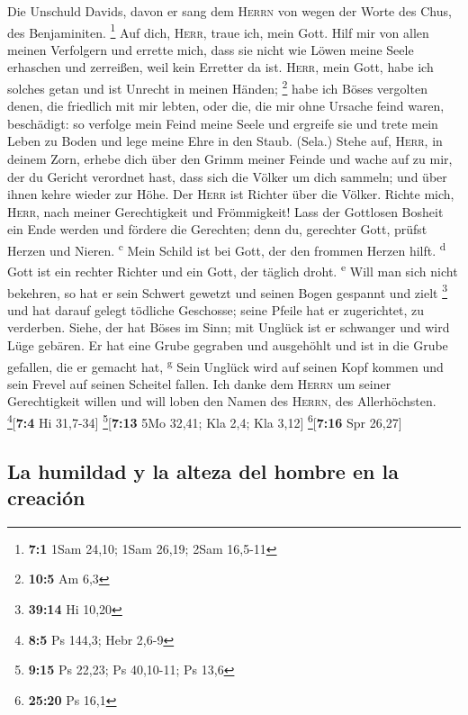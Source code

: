  Die Unschuld Davids, davon er sang dem \textsc{Herrn} von
wegen der Worte des Chus, des Benjaminiten. \footnote{\textbf{7:1} 1Sam
  24,10; 1Sam 26,19; 2Sam 16,5-11}  Auf dich,
\textsc{Herr}, traue ich, mein Gott. Hilf mir von allen meinen
Verfolgern und errette mich,  dass sie nicht wie Löwen
meine Seele erhaschen und zerreißen, weil kein Erretter da ist.
 \textsc{Herr}, mein Gott, habe ich solches getan und ist
Unrecht in meinen Händen; \footnote{\textbf{10:5} Am 6,3} 
habe ich Böses vergolten denen, die friedlich mit mir lebten, oder die,
die mir ohne Ursache feind waren, beschädigt:  so verfolge
mein Feind meine Seele und ergreife sie und trete mein Leben zu Boden
und lege meine Ehre in den Staub. (Sela.)  Stehe auf,
\textsc{Herr}, in deinem Zorn, erhebe dich über den Grimm meiner Feinde
und wache auf zu mir, der du Gericht verordnet hast,  dass
sich die Völker um dich sammeln; und über ihnen kehre wieder zur Höhe.
 Der \textsc{Herr} ist Richter über die Völker. Richte
mich, \textsc{Herr}, nach meiner Gerechtigkeit und Frömmigkeit!
 Lass der Gottlosen Bosheit ein Ende werden und fördere
die Gerechten; denn du, gerechter Gott, prüfst Herzen und Nieren.
\textsuperscript{c}  Mein Schild ist bei Gott, der den
frommen Herzen hilft. \textsuperscript{d}  Gott ist ein
rechter Richter und ein Gott, der täglich droht. \textsuperscript{e}
 Will man sich nicht bekehren, so hat er sein Schwert
gewetzt und seinen Bogen gespannt und zielt \footnote{\textbf{39:14} Hi
  10,20}  und hat darauf gelegt tödliche Geschosse; seine
Pfeile hat er zugerichtet, zu verderben.  Siehe, der hat
Böses im Sinn; mit Unglück ist er schwanger und wird Lüge gebären.
 Er hat eine Grube gegraben und ausgehöhlt und ist in die
Grube gefallen, die er gemacht hat, \textsuperscript{g} 
Sein Unglück wird auf seinen Kopf kommen und sein Frevel auf seinen
Scheitel fallen.  Ich danke dem \textsc{Herrn} um seiner
Gerechtigkeit willen und will loben den Namen des \textsc{Herrn}, des
Allerhöchsten. \footnote{\textbf{8:5} Ps 144,3; Hebr 2,6-9}{[}\textbf{7:4}
Hi 31,7-34{]} \footnote{\textbf{9:15} Ps 22,23; Ps 40,10-11; Ps 13,6}{[}\textbf{7:13}
5Mo 32,41; Kla 2,4; Kla 3,12{]} \footnote{\textbf{25:20} Ps 16,1}{[}\textbf{7:16}
Spr 26,27{]}

\hypertarget{la-humildad-y-la-alteza-del-hombre-en-la-creaciuxf3n}{%
\subsection{La humildad y la alteza del hombre en la
creación}\label{la-humildad-y-la-alteza-del-hombre-en-la-creaciuxf3n}}

